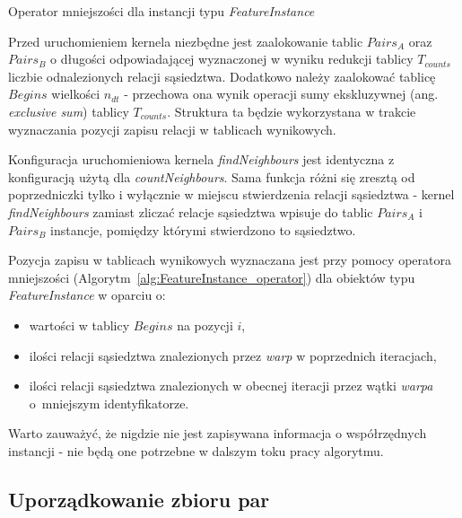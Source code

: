 \documentclass[12pt]{article}
\begin{document}
\begin{algorithm}
\caption{Operator mniejszości dla instancji typu \textit{FeatureInstance}}
\label{alg:FeatureInstance_operator}
\end{algorithm}

Przed uruchomieniem kernela niezbędne jest zaalokowanie tablic $ Pairs_{A} $ oraz $ Pairs_{B}$ o długości odpowiadającej wyznaczonej w wyniku redukcji tablicy $ T_{counts} $ liczbie odnalezionych relacji sąsiedztwa. Dodatkowo należy zaalokować tablicę $ Begins $ wielkości $ n_{dt} $ - przechowa ona wynik operacji sumy ekskluzywnej (ang. \textit{exclusive sum}) tablicy $ T_{counts} $. Struktura ta będzie wykorzystana w trakcie wyznaczania pozycji zapisu relacji w tablicach wynikowych.

Konfiguracja uruchomieniowa kernela \textit{findNeighbours} jest identyczna z konfiguracją użytą dla \textit{countNeighbours}. Sama funkcja różni się zresztą od poprzedniczki tylko i wyłącznie w miejscu stwierdzenia relacji sąsiedztwa - kernel \textit{findNeighbours} zamiast zliczać relacje sąsiedztwa wpisuje do tablic $ Pairs_{A} $ i $ Pairs_{B}$ instancje, pomiędzy którymi stwierdzono to sąsiedztwo. 

Pozycja zapisu w tablicach wynikowych wyznaczana jest przy pomocy operatora mniejszości (Algorytm~\ref{alg:FeatureInstance_operator}) dla obiektów typu \textit{FeatureInstance} w oparciu o:

\begin{itemize}
\item wartości w tablicy $ Begins $ na pozycji $i$,
\item ilości relacji sąsiedztwa znalezionych przez \textit{warp} w poprzednich iteracjach,
\item ilości relacji sąsiedztwa znalezionych w obecnej iteracji przez wątki \textit{warpa} o~mniejszym identyfikatorze. 
\end{itemize}

Warto zauważyć, że nigdzie nie jest zapisywana informacja o współrzędnych instancji - nie będą one potrzebne w dalszym toku pracy algorytmu.

\subsection{Uporządkowanie zbioru par}
\label{subsec:pair_ordering}
\end{document}
